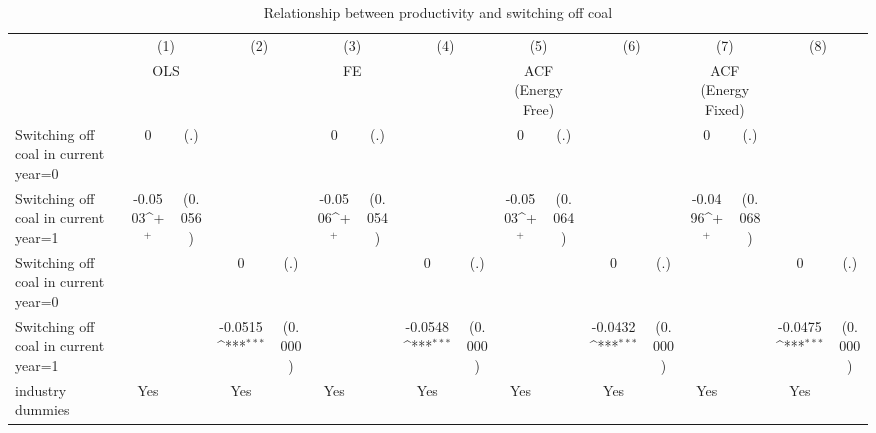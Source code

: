 \begin{table}[htbp]\centering
\def\sym#1{\ifmmode^{#1}\else\(^{#1}\)\fi}
\caption{Relationship between productivity and switching off coal}
\begin{tabular}{l*{8}{cc}}
\toprule
                    &\multicolumn{2}{c}{(1)}           &\multicolumn{2}{c}{(2)}           &\multicolumn{2}{c}{(3)}           &\multicolumn{2}{c}{(4)}           &\multicolumn{2}{c}{(5)}           &\multicolumn{2}{c}{(6)}           &\multicolumn{2}{c}{(7)}           &\multicolumn{2}{c}{(8)}           \\
                    &\multicolumn{2}{c}{OLS}           &\multicolumn{2}{c}{}              &\multicolumn{2}{c}{FE}            &\multicolumn{2}{c}{}              &\multicolumn{2}{c}{ACF (Energy Free)}&\multicolumn{2}{c}{}              &\multicolumn{2}{c}{ACF (Energy Fixed)}&\multicolumn{2}{c}{}              \\
\midrule
Switching off coal in current year=0&           0         &         (.)&                     &            &           0         &         (.)&                     &            &           0         &         (.)&                     &            &           0         &         (.)&                     &            \\
Switching off coal in current year=1&     -0.0503\sym{+}  &     (0.056)&                     &            &     -0.0506\sym{+}  &     (0.054)&                     &            &     -0.0503\sym{+}  &     (0.064)&                     &            &     -0.0496\sym{+}  &     (0.068)&                     &            \\
Switching off coal in current year=0&                     &            &           0         &         (.)&                     &            &           0         &         (.)&                     &            &           0         &         (.)&                     &            &           0         &         (.)\\
Switching off coal in current year=1&                     &            &     -0.0515\sym{***}&     (0.000)&                     &            &     -0.0548\sym{***}&     (0.000)&                     &            &     -0.0432\sym{***}&     (0.000)&                     &            &     -0.0475\sym{***}&     (0.000)\\
industry dummies    &         Yes         &            &         Yes         &            &         Yes         &            &         Yes         &            &         Yes         &            &         Yes         &            &         Yes         &            &         Yes         &            \\

\end{tabular}
\end{table}
